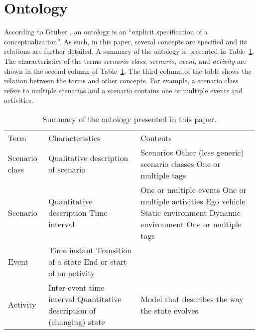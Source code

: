 \section{Ontology}
\label{sec:ontology}

According to Gruber \cite{gruber1993ontology}, an ontology is an ``explicit specification of a conceptualization''. As such, in this paper, several concepts are specified and its relations are further detailed. A summary of the ontology is presented in Table~\ref{tab:ontology}. The characteristics of the terms \emph{scenario class}, \emph{scenario}, \emph{event}, and \emph{activity} are shown in the second column of Table~\ref{tab:ontology}. The third column of the table shows the relation between the terms and other concepts. For example, a scenario class refers to multiple scenarios and a scenario contains one or multiple events and activities.

\begin{table}
	\begin{center}
		\caption{Summary of the ontology presented in this paper.}
		\label{tab:ontology}
		\begin{tabularx}{\linewidth}{p{3em} X X}
			\toprule
			Term & Characteristics & Contents \\ \otoprule
			Scenario class & Qualitative description of scenario & Scenarios \newline Other (less generic) scenario classes \newline One or multiple tags \\
			Scenario & Quantitative description \newline Time interval & One or multiple events \newline One or multiple activities \newline Ego vehicle \newline Static environment \newline Dynamic environment \newline One or multiple tags \\
			Event & Time instant \newline Transition of a state \newline End or start of an activity & \\
			Activity & Inter-event time interval \newline Quantitative description of (changing) state & Model that describes the way the state evolves \\
			\bottomrule
		\end{tabularx}
	\end{center}
\end{table}

